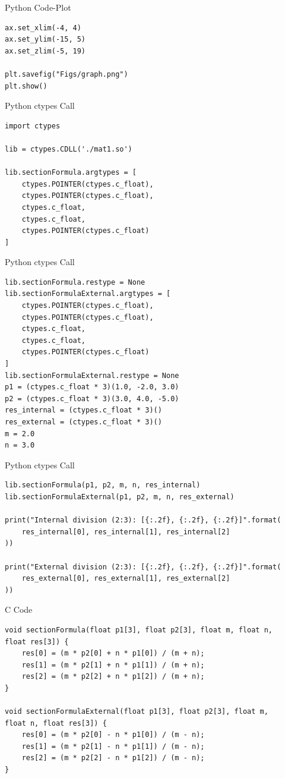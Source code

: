 \documentclass{beamer}
\begin{document}
\begin{frame}[fragile]{Python Code-Plot}
\begin{lstlisting}
ax.set_xlim(-4, 4)
ax.set_ylim(-15, 5)
ax.set_zlim(-5, 19)

plt.savefig("Figs/graph.png")
plt.show()
\end{lstlisting}
\end{frame}


\begin{frame}[fragile]{Python ctypes Call}
\begin{lstlisting}
import ctypes

lib = ctypes.CDLL('./mat1.so')

lib.sectionFormula.argtypes = [
    ctypes.POINTER(ctypes.c_float),
    ctypes.POINTER(ctypes.c_float),
    ctypes.c_float,
    ctypes.c_float,
    ctypes.POINTER(ctypes.c_float)
]
\end{lstlisting}
\end{frame}

\begin{frame}[fragile]{Python ctypes Call}
\begin{lstlisting}
lib.sectionFormula.restype = None
lib.sectionFormulaExternal.argtypes = [
    ctypes.POINTER(ctypes.c_float),
    ctypes.POINTER(ctypes.c_float),
    ctypes.c_float,
    ctypes.c_float,
    ctypes.POINTER(ctypes.c_float)
]
lib.sectionFormulaExternal.restype = None
p1 = (ctypes.c_float * 3)(1.0, -2.0, 3.0)
p2 = (ctypes.c_float * 3)(3.0, 4.0, -5.0)
res_internal = (ctypes.c_float * 3)()
res_external = (ctypes.c_float * 3)()
m = 2.0
n = 3.0
\end{lstlisting}
\end{frame}

\begin{frame}[fragile]{Python ctypes Call}
\begin{lstlisting}
lib.sectionFormula(p1, p2, m, n, res_internal)
lib.sectionFormulaExternal(p1, p2, m, n, res_external)

print("Internal division (2:3): [{:.2f}, {:.2f}, {:.2f}]".format(
    res_internal[0], res_internal[1], res_internal[2]
))

print("External division (2:3): [{:.2f}, {:.2f}, {:.2f}]".format(
    res_external[0], res_external[1], res_external[2]
))
\end{lstlisting}
\end{frame}
\begin{frame}[fragile]{C Code}
\begin{lstlisting}
void sectionFormula(float p1[3], float p2[3], float m, float n,
float res[3]) {
    res[0] = (m * p2[0] + n * p1[0]) / (m + n);
    res[1] = (m * p2[1] + n * p1[1]) / (m + n);
    res[2] = (m * p2[2] + n * p1[2]) / (m + n);
}

void sectionFormulaExternal(float p1[3], float p2[3], float m, 
float n, float res[3]) {
    res[0] = (m * p2[0] - n * p1[0]) / (m - n);
    res[1] = (m * p2[1] - n * p1[1]) / (m - n);
    res[2] = (m * p2[2] - n * p1[2]) / (m - n);
}
\end{lstlisting}
\end{frame}
\end{document}

